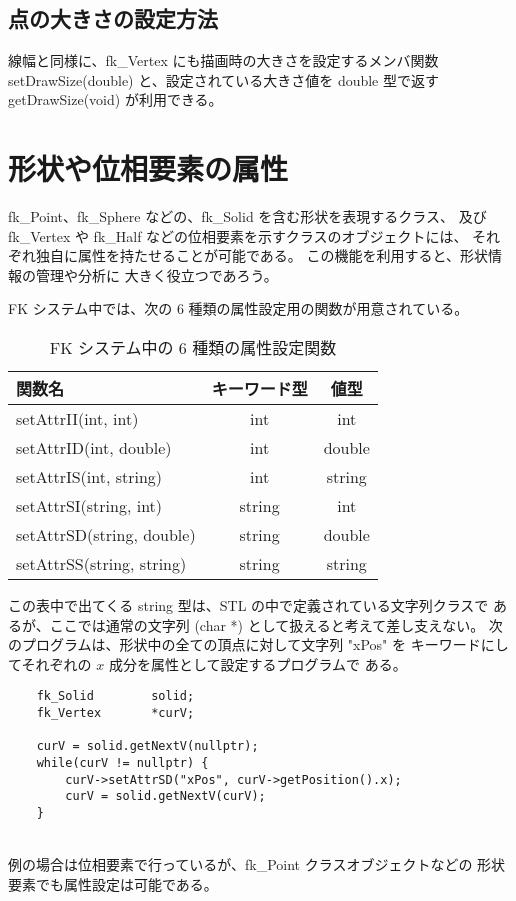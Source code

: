 \subsection{点の大きさの設定方法}
線幅と同様に、fk\_Vertex にも描画時の大きさを設定するメンバ関数
setDrawSize(double) と、設定されている大きさ値を double 型で返す
getDrawSize(void) が利用できる。

\section{形状や位相要素の属性} \label{sec:userattr}
fk\_Point、fk\_Sphere などの、fk\_Solid を含む形状を表現するクラス、
及び fk\_Vertex や fk\_Half などの位相要素を示すクラスのオブジェクトには、
それぞれ独自に属性を持たせることが可能である。
この機能を利用すると、形状情報の管理や分析に
大きく役立つであろう。

FK システム中では、次の 6 種類の属性設定用の関数が用意されている。

\begin{table}[H]
\caption{FK システム中の 6 種類の属性設定関数}
\label{tbl:attr1}
\begin{center}
\begin{tabular}{|l|c|c|}
\hline
関数名 & キーワード型 & 値型 \\ \hline \hline
setAttrII(int, int) & int & int \\ \hline
setAttrID(int, double) & int & double \\ \hline
setAttrIS(int, string) & int & string \\ \hline
setAttrSI(string, int) & string & int \\ \hline
setAttrSD(string, double) & string & double \\ \hline
setAttrSS(string, string) & string & string \\ \hline
\end{tabular}
\end{center}
\end{table}

この表中で出てくる string 型は、STL の中で定義されている文字列クラスで
あるが、ここでは通常の文字列 (char *) として扱えると考えて差し支えない。
次のプログラムは、形状中の全ての頂点に対して文字列 "xPos" を
キーワードにしてそれぞれの \(x\) 成分を属性として設定するプログラムで
ある。
\\
\begin{breakbox}
\begin{verbatim}
    fk_Solid        solid;
    fk_Vertex       *curV;

    curV = solid.getNextV(nullptr);
    while(curV != nullptr) {
        curV->setAttrSD("xPos", curV->getPosition().x);
        curV = solid.getNextV(curV);
    }
\end{verbatim}
\end{breakbox}
~ \\
例の場合は位相要素で行っているが、fk\_Point クラスオブジェクトなどの
形状要素でも属性設定は可能である。

